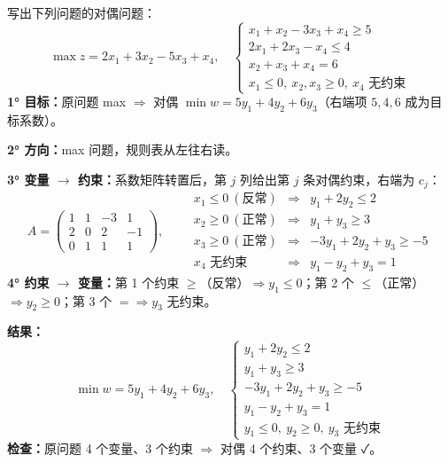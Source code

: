 \begin{examplebox}[例 2.1　\srcTag{笔记 P8--P9}]
写出下列问题的对偶问题：
\[
\max z=2x_1+3x_2-5x_3+x_4,\quad
\begin{cases}
x_1+x_2-3x_3+x_4\ge5\\
2x_1+2x_3-x_4\le4\\
x_2+x_3+x_4=6\\
x_1\le0,\ x_2,x_3\ge0,\ x_4\text{ 无约束}
\end{cases}
\]
\textbf{1° 目标：}原问题 max $\Rightarrow$ 对偶 $\min w=5y_1+4y_2+6y_3$（右端项 $5,4,6$ 成为目标系数）。\par
\textbf{2° 方向：}max 问题，规则表从左往右读。\par
\textbf{3° 变量 $\to$ 约束：}系数矩阵转置后，第 $j$ 列给出第 $j$ 条对偶约束，右端为 $c_j$：
\[
A=\begin{pmatrix}1&1&-3&1\\2&0&2&-1\\0&1&1&1\end{pmatrix},\qquad
\begin{array}{lll}
x_1\le0\ (\text{反常}) &\Rightarrow& y_1+2y_2\le2\\
x_2\ge0\ (\text{正常}) &\Rightarrow& y_1+y_3\ge3\\
x_3\ge0\ (\text{正常}) &\Rightarrow& -3y_1+2y_2+y_3\ge-5\\
x_4\text{ 无约束} &\Rightarrow& y_1-y_2+y_3=1
\end{array}
\]
\textbf{4° 约束 $\to$ 变量：}第 1 个约束 $\ge$（反常）$\Rightarrow y_1\le0$；第 2 个 $\le$（正常）$\Rightarrow y_2\ge0$；第 3 个 $=\Rightarrow y_3$ 无约束。\par
\textbf{结果：}
\[
\min w=5y_1+4y_2+6y_3,\quad
\begin{cases}
y_1+2y_2\le2\\ y_1+y_3\ge3\\ -3y_1+2y_2+y_3\ge-5\\ y_1-y_2+y_3=1\\ y_1\le0,\ y_2\ge0,\ y_3\text{ 无约束}
\end{cases}
\]
\textbf{检查：}原问题 4 个变量、3 个约束 $\Rightarrow$ 对偶 4 个约束、3 个变量 ✓。
\end{examplebox}

